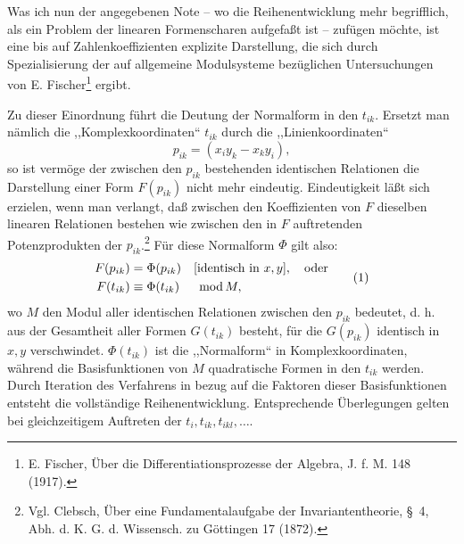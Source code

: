\documentclass[11pt]{article}
\providecommand{\modu}[1]{\;\operatorname{mod} #1}
\begin{document}
Was ich nun der angegebenen Note -- wo die Reihenentwicklung mehr begrifflich, als ein Problem der linearen Formenscharen aufgefaßt ist -- zufügen möchte, ist eine bis auf Zahlenkoeffizienten explizite Darstellung, die sich durch Spezialisierung der auf allgemeine Modulsysteme bezüglichen Untersuchungen von E. Fischer\footnote{E. Fischer, Über die Differentiationsprozesse der Algebra, J. f. M. 148 (1917).} ergibt.

Zu dieser Einordnung führt die Deutung der Normalform in den $t_{ik}$. Ersetzt man nämlich die ,,Komplexkoordinaten`` $t_{ik}$ durch die ,,Linienkoordinaten``
\[
        p_{ik}=(x_i y_k-x_k y_i),
\]
so ist vermöge der zwischen den $p_{ik}$ bestehenden identischen Relationen die Darstellung einer Form $F(p_{ik})$ nicht mehr eindeutig. Eindeutigkeit läßt sich erzielen, wenn man verlangt, daß zwischen den Koeffizienten von $F$ dieselben linearen Relationen bestehen wie zwischen den in $F$ auftretenden Potenzprodukten der $p_{ik}$.\footnote{Vgl. Clebsch, Über eine Fundamentalaufgabe der Invariantentheorie, \S~4, Abh. d. K. G. d. Wissensch. zu Göttingen 17 (1872).} Für diese Normalform $\Phi$ gilt also:
\begin{equation}
\begin{aligned}
        F(p_{ik})&=\Phi(p_{ik}) &&[\text{identisch in }x,y],\quad\text{oder}\notag\\
        F(t_{ik})&\equiv\Phi(t_{ik}) &&\modu{M},
\end{aligned}
\tag{1}
\end{equation}
wo $M$ den Modul aller identischen Relationen zwischen den $p_{ik}$ bedeutet, d. h. aus der Gesamtheit aller Formen $G(t_{ik})$ besteht, für die $G(p_{ik})$ identisch in $x,y$ verschwindet. $\Phi(t_{ik})$ ist die ,,Normalform`` in Komplexkoordinaten, während die Basisfunktionen von $M$ quadratische Formen in den $t_{ik}$ werden. Durch Iteration des Verfahrens in bezug auf die Faktoren dieser Basisfunktionen entsteht die vollständige Reihenentwicklung. Entsprechende Überlegungen gelten bei gleichzeitigem Auftreten der $t_i,t_{ik},t_{ikl},\ldots$.
\end{document}
